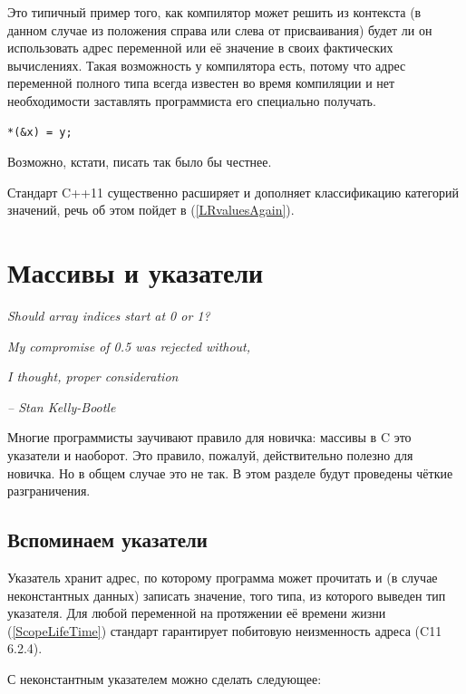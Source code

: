 \documentclass[a4paper,12pt,oneside]{book}
\begin{document}
Это типичный пример того, как компилятор может решить из контекста (в данном случае из положения справа или слева от присваивания) будет ли он использовать адрес переменной или её значение в своих фактических вычислениях. Такая возможность у компилятора есть, потому что адрес переменной полного типа всегда известен во время компиляции и нет необходимости заставлять программиста его специально получать.

\begin{lstlisting}
*(&x) = y;
\end{lstlisting}

Возможно, кстати, писать так было бы честнее.

Стандарт C++11 существенно расширяет и дополняет классификацию категорий значений, речь об этом пойдет в (\ref{LRvaluesAgain}).

\pagebreak
\section{Массивы и указатели}\label{subsec:arrpointers}

\hfill\textit{Should array indices start at 0 or 1?}

\hfill\textit{My compromise of 0.5 was rejected without,} 

\hfill\textit{I thought, proper consideration}{\vspace{0.5em}}

\hfill\textit{-- Stan Kelly-Bootle}

Многие программисты заучивают правило для новичка: массивы в C это указатели и наоборот. Это правило, пожалуй, действительно полезно для новичка. Но в общем случае это не так. В этом разделе будут проведены чёткие разграничения. 

\subsection{Вспоминаем указатели}

Указатель хранит адрес, по которому программа может прочитать и (в случае неконстантных данных) записать значение, того типа, из которого выведен тип указателя. Для любой переменной на протяжении её времени жизни (\ref{ScopeLifeTime}) стандарт гарантирует побитовую неизменность адреса (C11 6.2.4).

С неконстантным указателем можно сделать следующее:
\end{document}
